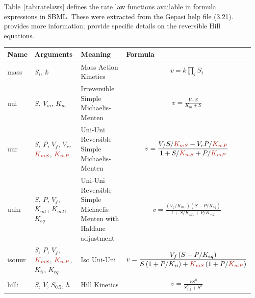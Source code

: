 \documentclass[10pt]{cekarticle}
\newcommand{\changed}[1]{\textcolor{BrickRed}{#1}}
\begin{document}
Table~\ref{tab:ratelaws} defines the rate law functions available in
formula expressions in SBML.  These were extracted from the Gepasi help
file (3.21).  \citet{segel:1993} provides more information;
\citet{hofmeyr:1997} provide specific details on the reversible Hill
equations.

\begin{table}[ht]
\setlength{\abovedisplayskip}{1pt}
\setlength{\belowdisplayskip}{1pt}
\begin{tabular}{|m{0.5in}|>{\raggedright}m{0.78in}|>{\raggedright}m{1.2in}|m{3.3in}|}
\hline
\textbf{Name} & \textbf{Arguments} & \textbf{Meaning} &
\textbf{Formula} \\
\hline

mass & $S_i$, $k$ & Mass Action Kinetics &
\begin{gather*}
v = k \prod_i S_i
\end{gather*}
\\ \hline

uui & $S$, $V_m$, $K_m$ & Irreversible Simple Michaelis-Menten  &
\begin{gather*}
v = \frac{V_m S}{K_m + S}
\end{gather*}
\\ \hline

uur & $S$, $P$, $V_f$, $V_r$, $\changed{K_{mS}}$, $\changed{K_{mP}}$ & Uni-Uni Reversible Simple
Michaelis-Menten &
\begin{gather*}
v = \frac{V_f S /\changed{K_{mS}} - V_r  P / \changed{K_{mP}}}{1 + S / \changed{K_{mS}} +
P / \changed{K_{mP}} }
\end{gather*}
\\ \hline

uuhr & $S$, $P$, $V_f$, $K_{m1}$, $K_{m2}$, $K_{eq}$ & Uni-Uni
Reversible Simple Michaelis-Menten with Haldane adjustment &
\begin{gather*}
v = \frac{\left( V_f / K_{m1} \right) \left(S -
P / K_{eq} \right)}{1 + S / K_{m1} + P / K_{m2}}
\end{gather*}
\\ \hline

isouur & $S$, $P$, $V_f$, $\changed{K_{mS}}$, $\changed{K_{mP}}$, $K_{ii}$, $K_{eq}$ & Iso Uni-Uni &
\begin{gather*}
v = \frac{V_f \left(S - P/ K_{eq}\right)}{S \left(1
+ P/ K_{ii}\right) + \changed{K_{mS}} \left(1 + P / \changed{K_{mP}}\right)}
\end{gather*}
\\ \hline

hilli & $S$, $V$, $S_{0.5}$, $h$ & Hill Kinetics &
\begin{gather*}
v = \frac{V S^h}{S_{0.5}^h + S^h}
\end{gather*}
\\ \hline


\end{tabular}
\end{table}
\end{document}
